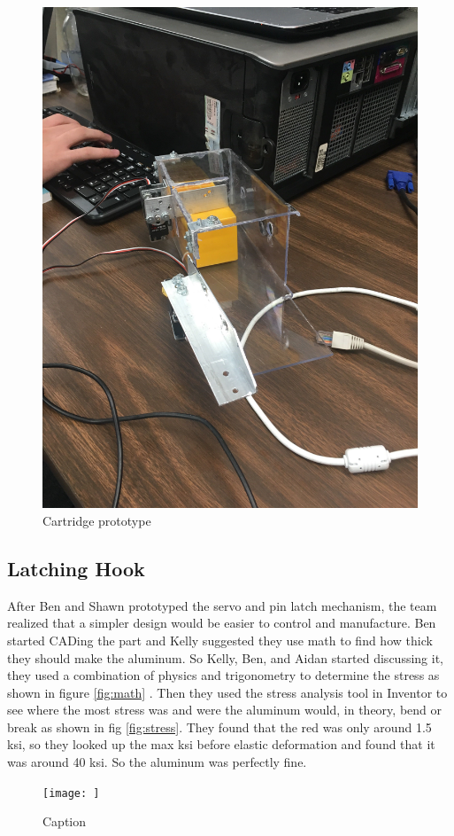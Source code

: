\documentclass{article}
\begin{document}
\begin{figure}
    \centering
    \includegraphics[width=.6 \textwidth]{14_12-03/images/cartridge3.JPG}
    \caption{Cartridge prototype}
    \label{fig:thing}
\end{figure}

\subsection{Latching Hook}
After Ben and Shawn prototyped the servo and pin latch mechanism, the team realized that a simpler design would be easier to control and manufacture. Ben started CADing the part and Kelly suggested they use math to find how thick they should make the aluminum. So Kelly, Ben, and Aidan started discussing it, they used a combination of physics and trigonometry to determine the stress as shown in figure \ref{fig:math} . Then they used the stress analysis tool in Inventor to see where the most stress was and were the aluminum would, in theory, bend or break as shown in fig \ref{fig:stress}. They found that the red was only around 1.5 ksi, so they looked up the max ksi before elastic deformation and found that it was around 40 ksi. So the aluminum was perfectly fine.

\begin{figure}
    \centering
    \texttt{[image: ]}
    \caption{Caption}
    \label{fig:my_label}
\end{figure}
\end{document}
